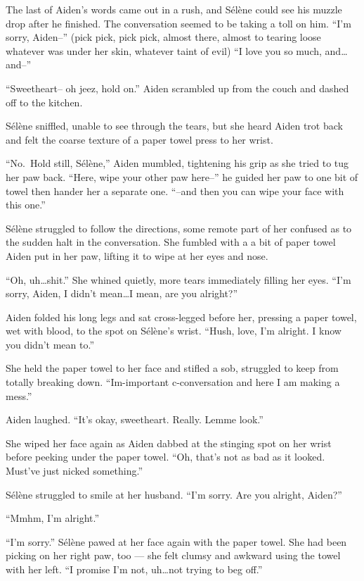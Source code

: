 The last of Aiden's words came out in a rush, and Sélène could see his muzzle drop after he finished. The conversation seemed to be taking a toll on him. ``I'm sorry, Aiden--'' (pick pick, pick pick, almost there, almost to tearing loose whatever was under her skin, whatever taint of evil) ``I love you so much, and\ldots{}and--''

``Sweetheart-- oh jeez, hold on.'' Aiden scrambled up from the couch and dashed off to the kitchen.

Sélène sniffled, unable to see through the tears, but she heard Aiden trot back and felt the coarse texture of a paper towel press to her wrist.

``No.~Hold still, Sélène,'' Aiden mumbled, tightening his grip as she tried to tug her paw back. ``Here, wipe your other paw here--'' he guided her paw to one bit of towel then hander her a separate one. ``--and then you can wipe your face with this one.''

Sélène struggled to follow the directions, some remote part of her confused as to the sudden halt in the conversation. She fumbled with a a bit of paper towel Aiden put in her paw, lifting it to wipe at her eyes and nose.

``Oh, uh\ldots{}shit.'' She whined quietly, more tears immediately filling her eyes. ``I'm sorry, Aiden, I didn't mean\ldots{}I mean, are you alright?''

Aiden folded his long legs and sat cross-legged before her, pressing a paper towel, wet with blood, to the spot on Sélène's wrist. ``Hush, love, I'm alright. I know you didn't mean to.''

She held the paper towel to her face and stifled a sob, struggled to keep from totally breaking down. ``Im-important c-conversation and here I am making a mess.''

Aiden laughed. ``It's okay, sweetheart. Really. Lemme look.''

She wiped her face again as Aiden dabbed at the stinging spot on her wrist before peeking under the paper towel. ``Oh, that's not as bad as it looked. Must've just nicked something.''

Sélène struggled to smile at her husband. ``I'm sorry. Are you alright, Aiden?''

``Mmhm, I'm alright.''

``I'm sorry.'' Sélène pawed at her face again with the paper towel. She had been picking on her right paw, too --- she felt clumsy and awkward using the towel with her left. ``I promise I'm not, uh\ldots{}not trying to beg off.''

